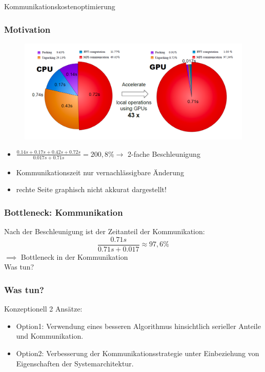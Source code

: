\frame
{
	\begin{center}
		\Large Kommunikationskostenoptimierung \normalsize
	\end{center}
}
\frame
{
	\frametitle{Motivation}
	\begin{figure}[h!]
		\centering
		\includegraphics[width=\linewidth, keepaspectratio]{../res/speedup.png}
	\end{figure}
	\begin{itemize}
		\item $\frac{0.14s+0.17s+0.42s+0.72s}{0.017s+0.71s}=200,8\% \rightarrow$  2-fache Beschleunigung
		\item Kommunikationszeit nur vernachlässigbare Änderung
		\item rechte Seite graphisch nicht akkurat dargestellt!
	\end{itemize}
}
\frame
{
	\frametitle{Bottleneck: Kommunikation}
	Nach der Beschleunigung ist der  Zeitanteil der Kommunikation:\\
	$$\frac{0.71s}{0.71s+0.017}\approx97,6\%$$
	$\implies$ Bottleneck in der Kommunikation\\
	\large Was tun? \normalsize
}
\frame
{
	\frametitle{Was tun?}
	Konzeptionell 2 Ansätze:
	\begin{itemize}
		\item Option1: Verwendung eines besseren Algorithmus hinsichtlich serieller Anteile und Kommunikation.
		\item Option2: Verbesserung der Kommunikationsstrategie unter Einbeziehung von Eigenschaften der Systemarchitektur.
	\end{itemize}
}
\frame
